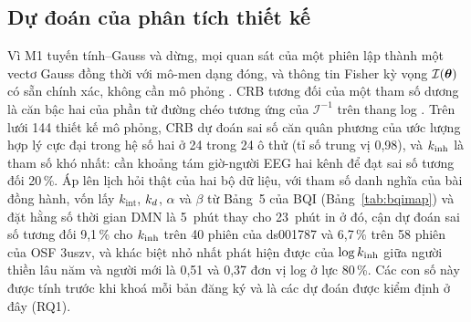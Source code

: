 \subsection{Dự đoán của phân tích thiết kế}
\label{sec:predictions}
Vì M1 tuyến tính--Gauss và dừng, mọi quan sát của một phiên lập thành một vectơ Gauss đồng thời với mô-men dạng đóng, và thông tin Fisher kỳ vọng $\mathcal I(\boldsymbol{\theta})$ có sẵn chính xác, không cần mô phỏng \cite{companion}. CRB tương đối của một tham số dương là căn bậc hai của phần tử đường chéo tương ứng của $\mathcal I^{-1}$ trên thang log \cite{Rao1945,Cramer1946}. Trên lưới 144 thiết kế mô phỏng, CRB dự đoán sai số căn quân phương của ước lượng hợp lý cực đại trong hệ số hai ở 24 trong 24 ô thử (tỉ số trung vị 0,98), và $k_{\mathrm{inh}}$ là tham số khó nhất: cần khoảng tám giờ-người EEG hai kênh để đạt sai số tương đối 20\,\%. Áp lên lịch hỏi thật của hai bộ dữ liệu, với tham số danh nghĩa của bài đồng hành, vốn lấy $k_{\mathrm{int}}$, $k_{d}$, $\alpha$ và $\beta$ từ Bảng~5 của BQI \cite{BQI} (Bảng~\ref{tab:bqimap}) và đặt hằng số thời gian DMN là 5~phút thay cho 23~phút in ở đó, cận dự đoán sai số tương đối 9,1\,\% cho $k_{\mathrm{inh}}$ trên 40 phiên của ds001787 và 6,7\,\% trên 58 phiên của OSF 3uszv, và khác biệt nhỏ nhất phát hiện được của $\log k_{\mathrm{inh}}$ giữa người thiền lâu năm và người mới là 0,51 và 0,37 đơn vị log ở lực 80\,\%. Các con số này được tính trước khi khoá mỗi bản đăng ký và là các dự đoán được kiểm định ở đây (RQ1).

